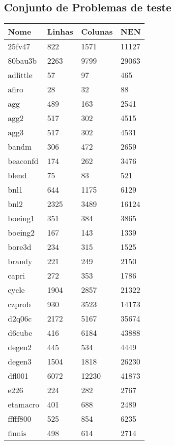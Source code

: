 \subsection{Conjunto de Problemas de teste}

\begin{tabular}{llll}
\toprule
Nome     & Linhas  & Colunas  & NEN \\
\midrule
25fv47   & 822   & 1571  & 11127    \\
80bau3b  & 2263  & 9799  & 29063    \\
adlittle & 57    & 97    & 465      \\
afiro    & 28    & 32    & 88       \\
agg      & 489   & 163   & 2541     \\
agg2     & 517   & 302   & 4515     \\
agg3     & 517   & 302   & 4531     \\
bandm    & 306   & 472   & 2659     \\
beaconfd & 174   & 262   & 3476     \\
blend    & 75    & 83    & 521      \\
bnl1     & 644   & 1175  & 6129     \\
bnl2     & 2325  & 3489  & 16124    \\
boeing1  & 351   & 384   & 3865     \\
boeing2  & 167   & 143   & 1339     \\
bore3d   & 234   & 315   & 1525     \\
brandy   & 221   & 249   & 2150     \\
capri    & 272   & 353   & 1786     \\
cycle    & 1904  & 2857  & 21322    \\
czprob   & 930   & 3523  & 14173    \\
d2q06c   & 2172  & 5167  & 35674    \\
d6cube   & 416   & 6184  & 43888    \\
degen2   & 445   & 534   & 4449     \\
degen3   & 1504  & 1818  & 26230    \\
dfl001   & 6072  & 12230 & 41873    \\
e226     & 224   & 282   & 2767     \\
etamacro & 401   & 688   & 2489     \\
fffff800 & 525   & 854   & 6235     \\
finnis   & 498   & 614   & 2714     \\

\end{tabular}
